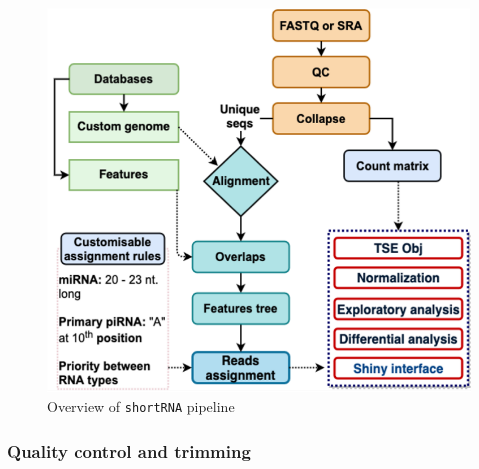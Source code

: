 \documentclass[12pt,twoside]{reedthesis}
\begin{document}
\begin{figure}[htbp]

{\centering \includegraphics{thesis_files/figure-latex/3f2-1} 

}

\caption{Overview of \texttt{shortRNA} pipeline}\label{fig:3f2}
\end{figure}
\hypertarget{quality-control-and-trimming}{%
\subsubsection{Quality control and trimming}\label{quality-control-and-trimming}}
\end{document}
